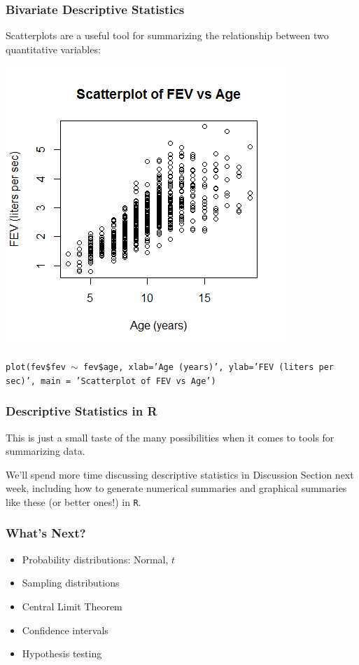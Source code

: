 \documentclass[12pt, 
hyperref={colorlinks=true, linkcolor=blue, urlcolor=cyan}]{beamer}
\begin{document}
\begin{frame}
\frametitle{Bivariate Descriptive Statistics}

Scatterplots are a useful tool for summarizing the relationship between two quantitative variables:

\vspace{-0.8cm} \center \includegraphics[height=0.65\textheight]{./scatterplot-fev-age}

\vspace{-0.4cm} \begin{scriptsize} \texttt{plot(fev\$fev $\sim$ fev\$age, xlab='Age (years)', ylab='FEV (liters per sec)', main = 'Scatterplot of FEV vs Age')\\} \end{scriptsize}

\end{frame}

\begin{frame}
\frametitle{Descriptive Statistics in R}

This is just a small taste of the many possibilities when it comes to tools for summarizing data.

We'll spend more time discussing descriptive statistics in Discussion Section next week, including how to generate numerical summaries and graphical summaries like these (or better ones!) in \texttt{R}.
\end{frame}

\begin{frame}
\frametitle{What's Next?}
\begin{itemize}
\item Probability distributions: Normal, $t$
\item Sampling distributions
\item Central Limit Theorem
\item Confidence intervals
\item Hypothesis testing
\end{itemize}
\end{frame}

\end{document}

